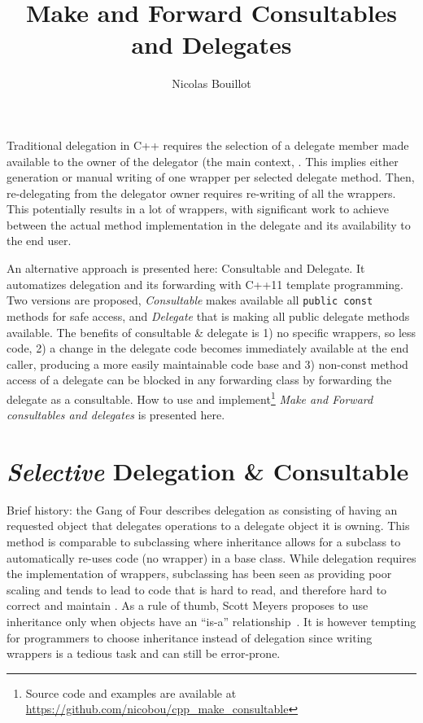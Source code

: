 \documentclass{article}
\begin{document}
\title{Make and Forward Consultables and Delegates}
\author{Nicolas Bouillot}
\maketitle

Traditional delegation in C++ requires the selection of a delegate member made available to the owner of the delegator (the main context, . This implies either generation or manual writing of one wrapper per selected delegate method. Then, re-delegating from the delegator owner requires re-writing of all the wrappers. This potentially results in a lot of wrappers, with significant work to achieve between the actual method implementation in the delegate and its availability to the end user. 

An alternative approach is presented here: Consultable and Delegate. It automatizes delegation and its forwarding with C++11 template programming. Two versions are proposed, \textit{Consultable} makes available all \verb+public const+ methods for safe access, and \textit{Delegate} that is making all public delegate methods available. The benefits of consultable \& delegate  is 1) no specific wrappers, so less code, 2) a change in the delegate code becomes immediately available at the end caller, producing a more easily maintainable code base and 3) non-const method access of a delegate can be blocked in any forwarding class by forwarding the delegate as a consultable. How to use and implement\footnote{Source code and examples are available at\\ \url{https://github.com/nicobou/cpp_make_consultable}} \textit{Make and Forward consultables and delegates} is presented here.  

\section{\textit{Selective} Delegation \& Consultable}
Brief history: the Gang of Four\cite{1995gamma} describes delegation as consisting of having an requested object that delegates operations to a delegate object it is owning. This method is comparable to subclassing where inheritance allows for a subclass to automatically re-uses code (no wrapper) in a base class.  While delegation requires the implementation of wrappers, subclassing has been seen as providing poor scaling and tends to lead to code that is hard to read, and therefore hard to correct and maintain \cite{2007cser}. As a rule of thumb, Scott Meyers proposes to use inheritance only when objects have an ``is-a'' relationship~\cite{2005Meyers}. It is however tempting for programmers to choose inheritance instead of delegation since writing wrappers is a tedious task and can still be error-prone.
\end{document}

